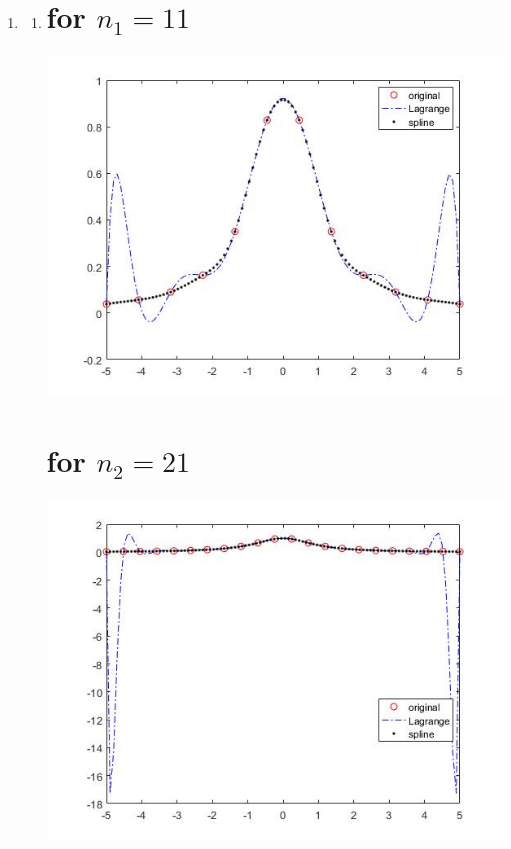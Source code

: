 \documentclass[12pt]{article}
\begin{document}
\begin{enumerate}
    \item
        \begin{enumerate}
            \item %
                \lstset{language=Matlab,showstringspaces=false}
                \section*{for $n_1 = 11$}
                
                \includegraphics[width=5in]{11.jpg}\\
                \section*{for $n_2 = 21$}
                
                \includegraphics[width=5in]{21.jpg}\\
            

\end{enumerate}
\end{enumerate}
\end{document}
